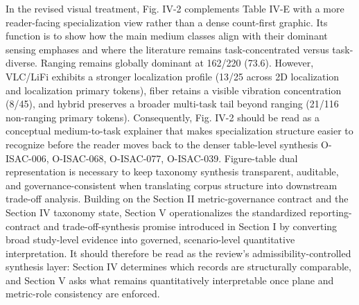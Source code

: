 {}In the revised visual treatment, Fig. IV-2 complements Table IV-E with a more reader-facing specialization view rather than a dense count-first graphic. Its function is to show how the main medium classes align with their dominant sensing emphases and where the literature remains task-concentrated versus task-diverse. Ranging remains globally dominant at 162/220 (73.6\markdownRendererPercentSign{}). However, VLC/LiFi exhibits a stronger localization profile (13/25 across 2D localization and localization primary tokens), fiber retains a visible vibration concentration (8/45), and hybrid preserves a broader multi-task tail beyond ranging (21/116 non-ranging primary tokens). Consequently, Fig. IV-2 should be read as a conceptual medium-to-task explainer that makes specialization structure easier to recognize before the reader moves back to the denser table-level synthesis O-ISAC-006, O-ISAC-068, O-ISAC-077, O-ISAC-039.\markdownRendererParagraphSeparator
{}\markdownRendererParagraphSeparator
{} Figure-table dual representation is necessary to keep taxonomy synthesis transparent, auditable, and governance-consistent when translating corpus structure into downstream trade-off analysis.\markdownRendererInterblockSeparator
{}
\markdownRendererSectionEnd 
\markdownRendererSectionEnd 
\markdownRendererSectionEnd \markdownRendererSectionBegin
{}\markdownRendererInterblockSeparator
{}Building on the Section II metric-governance contract and the Section IV taxonomy state, Section V operationalizes the standardized reporting-contract and trade-off-synthesis promise introduced in Section I by converting broad study-level evidence into governed, scenario-level quantitative interpretation. It should therefore be read as the review's admissibility-controlled synthesis layer: Section IV determines which records are structurally comparable, and Section V asks what remains quantitatively interpretable once plane and metric-role consistency are enforced.\markdownRendererInterblockSeparator
